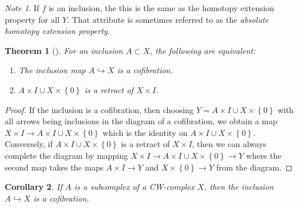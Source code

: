 \documentclass[reqno]{amsart}
\newtheorem{theorem}{Theorem}[section]
\newtheorem{corollary}[theorem]{Corollary}
\theoremstyle{definition}
\theoremstyle{remark}
\newtheorem*{note}{Note}
\begin{document}
\begin{note}
    If $f$ is an inclusion, the this is the same
    as the homotopy extension property for all $Y$. That attribute
    is sometimes referred to as the 
    \textit{absolute homotopy extension property}.
\end{note}

\begin{theorem}[]
    For an inclusion $A \subset X$, the following are equivalent:
    \begin{enumerate}
        \item The inclusion map $A \hookrightarrow X$ is a 
            cofibration.
        \item $A \times I \cup  X \times  \left\{ 0 \right\} $ 
            is a retract of $X \times I$.
    \end{enumerate}
\end{theorem}

\begin{proof}
    If the inclusion is a cofibration, then choosing
    $Y = A \times I \cup  X \times \left\{ 0 \right\} $ 
    with all arrows being inclusions in the
    diagram of a cofibration, we obtain a map
    $X \times I \to A \times I \cup  X \times \left\{ 0 \right\} $ 
    which is the identity on
    $A \times I \cup  X \times \left\{ 0 \right\} $.\\
    Conversely, if $A \times I \cup  X \times \left\{ 0 \right\} $ 
    is a retract of $X \times I$, then
    we can always complete the diagram by
    mapping $X \times I \to 
    A \times I \cup  X \times  \left\{ 0 \right\} 
    \to Y$ where the second map
    takes the maps $A \times I \to Y$ and
    $X \times \left\{ 0 \right\} \to Y$ from the diagram.
\end{proof}

\begin{corollary}
    If $A$ is a subcomplex of a CW-complex $X$, then
    the inclusion $A \hookrightarrow X$ is a cofibration.
\end{corollary}
\end{document}
